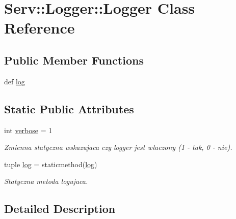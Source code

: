 \hypertarget{class_serv_1_1_logger_1_1_logger}{
\section{Serv::Logger::Logger Class Reference}
\label{class_serv_1_1_logger_1_1_logger}
}
\subsection*{Public Member Functions}
\begin{CompactItemize}
\item 
def \hyperlink{class_serv_1_1_logger_1_1_logger_03728c5f5817396e373bde7861b69d69}{log}
\end{CompactItemize}
\subsection*{Static Public Attributes}
\begin{CompactItemize}
\item 
\hypertarget{class_serv_1_1_logger_1_1_logger_22b9bdb8768d7f8b09bb8b3d44ee7e08}{
int \hyperlink{class_serv_1_1_logger_1_1_logger_22b9bdb8768d7f8b09bb8b3d44ee7e08}{verbose} = 1}
\label{class_serv_1_1_logger_1_1_logger_22b9bdb8768d7f8b09bb8b3d44ee7e08}

\begin{CompactList}\small\item\em Zmienna statyczna wskazujaca czy logger jest wlaczony (1 - tak, 0 - nie). \item\end{CompactList}\item 
\hypertarget{class_serv_1_1_logger_1_1_logger_39152ac6c2beb98a302c7fd6839427d6}{
tuple \hyperlink{class_serv_1_1_logger_1_1_logger_39152ac6c2beb98a302c7fd6839427d6}{log} = staticmethod(\hyperlink{class_serv_1_1_logger_1_1_logger_39152ac6c2beb98a302c7fd6839427d6}{log})}
\label{class_serv_1_1_logger_1_1_logger_39152ac6c2beb98a302c7fd6839427d6}

\begin{CompactList}\small\item\em Statyczna metoda logujaca. \item\end{CompactList}\end{CompactItemize}


\subsection{Detailed Description}


